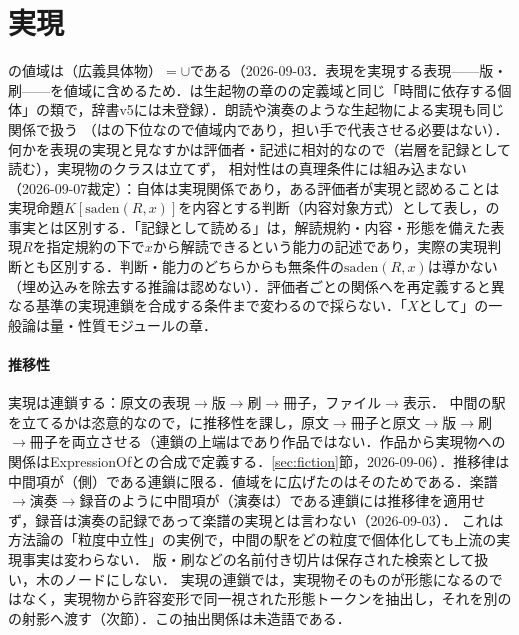 \documentclass[../../main-detail.tex]{subfiles}
\begin{document}
\section{実現}
の値域は（広義具体物）$=$$\cup$である（2026-09-03．表現を実現する表現——版・刷——を値域に含めるため．は生起物の章のの定義域と同じ「時間に依存する個体」の類で，辞書v5には未登録）．朗読や演奏のような生起物による実現も同じ関係で扱う
（はの下位なので値域内であり，担い手で代表させる必要はない）．
何かを表現の実現と見なすかは評価者・記述に相対的なので（岩層を記録として読む），実現物のクラスは立てず，
相対性はの真理条件には組み込まない（2026-09-07裁定）：自体は実現関係であり，ある評価者が実現と認めることは実現命題$K[\mathrm{saden}(R,x)]$を内容とする判断（内容対象方式）として表し，の事実とは区別する．「記録として読める」は，解読規約・内容・形態を備えた表現$R$を指定規約の下で$x$から解読できるという能力の記述であり，実際の実現判断とも区別する．判断・能力のどちらからも無条件の$\mathrm{saden}(R,x)$は導かない（埋め込みを除去する推論は認めない）．評価者ごとの関係へを再定義すると異なる基準の実現連鎖を合成する条件まで変わるので採らない．「$X$として」の一般論は量・性質モジュールの章．

\paragraph{推移性} 実現は連鎖する：原文の表現$\to$版$\to$刷$\to$冊子，ファイル$\to$表示．
中間の駅を立てるかは恣意的なので，に推移性を課し，原文$\to$冊子と原文$\to$版$\to$刷$\to$冊子を両立させる（連鎖の上端はであり作品ではない．作品から実現物への関係はExpressionOfとの合成で定義する．\ref{sec:fiction}節，2026-09-06）．推移律は中間項が（側）である連鎖に限る．値域をに広げたのはそのためである．楽譜$\to$演奏$\to$録音のように中間項が（演奏は）である連鎖には推移律を適用せず，録音は演奏の記録であって楽譜の実現とは言わない（2026-09-03）．
これは方法論の「粒度中立性」の実例で，中間の駅をどの粒度で個体化しても上流の実現事実は変わらない．
版・刷などの名前付き切片は保存された検索として扱い，木のノードにしない．
実現の連鎖では，実現物そのものが形態になるのではなく，実現物から許容変形で同一視された形態トークンを抽出し，それを別のの射影へ渡す（次節）．この抽出関係は未造語である．
\end{document}
